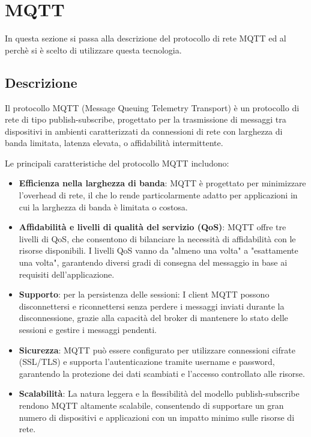 \section{MQTT}
In questa sezione si passa alla descrizione del protocollo di rete MQTT ed al perchè si è scelto di utilizzare questa tecnologia.

\subsection{Descrizione}
Il protocollo MQTT (Message Queuing Telemetry Transport) è un protocollo di rete di tipo publish-subscribe, progettato per la trasmissione di messaggi tra dispositivi in ambienti caratterizzati da connessioni di rete con larghezza di banda limitata, latenza elevata, o affidabilità intermittente.

\noindent Le principali caratteristiche del protocollo MQTT includono:

\begin{itemize}
  \item \textbf{Efficienza nella larghezza di banda}: MQTT è progettato per minimizzare l'overhead di rete, il che lo rende particolarmente adatto per applicazioni in cui la larghezza di banda è limitata o costosa.
    
  \item \textbf{Affidabilità e livelli di qualità del servizio (QoS)}: MQTT offre tre livelli di QoS, che consentono di bilanciare la necessità di affidabilità con le risorse disponibili. I livelli QoS vanno da "almeno una volta" a "esattamente una volta", garantendo diversi gradi di consegna del messaggio in base ai requisiti dell'applicazione.
    
  \item \textbf{Supporto}: per la persistenza delle sessioni: I client MQTT possono disconnettersi e riconnettersi senza perdere i messaggi inviati durante la disconnessione, grazie alla capacità del broker di mantenere lo stato delle sessioni e gestire i messaggi pendenti.

  \item \textbf{Sicurezza}: MQTT può essere configurato per utilizzare connessioni cifrate (SSL/TLS) e supporta l'autenticazione tramite username e password, garantendo la protezione dei dati scambiati e l'accesso controllato alle risorse.

  \item \textbf{Scalabilità}: La natura leggera e la flessibilità del modello publish-subscribe rendono MQTT altamente scalabile, consentendo di supportare un gran numero di dispositivi e applicazioni con un impatto minimo sulle risorse di rete.
\end{itemize}

